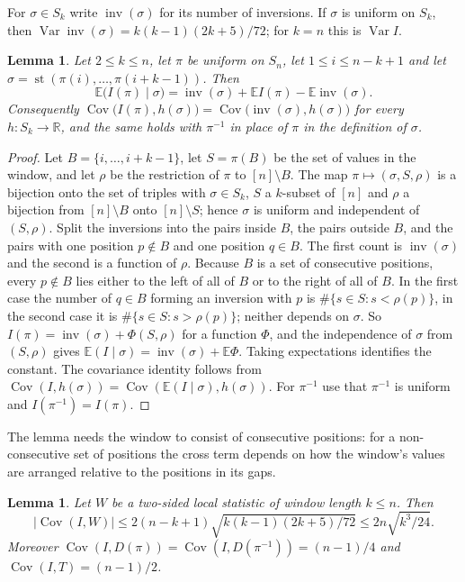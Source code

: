 \documentclass[11pt]{amsart}
\newtheorem{lemma}[theorem]{Lemma}
\theoremstyle{remark}
\newcommand{\E}{\mathbb{E}}
\newcommand{\Var}{\operatorname{Var}}
\newcommand{\Cov}{\operatorname{Cov}}
\newcommand{\inv}{\operatorname{inv}}
\begin{document}
For $\sigma\in S_k$ write $\inv(\sigma)$ for its number of inversions. If $\sigma$ is uniform on $S_k$, then
$\Var\inv(\sigma)=k(k-1)(2k+5)/72$; for $k=n$ this is $\Var I$.

\begin{lemma}\label{lem:window}
Let $2\le k\le n$, let $\pi$ be uniform on $S_n$, let $1\le i\le n-k+1$ and let $\sigma=\operatorname{st}(\pi(i),\dots,\pi(i+k-1))$.
Then
\[
\E\bigl(I(\pi)\mid\sigma\bigr)=\inv(\sigma)+\E I(\pi)-\E\inv(\sigma).
\]
Consequently $\Cov\bigl(I(\pi),h(\sigma)\bigr)=\Cov\bigl(\inv(\sigma),h(\sigma)\bigr)$ for every $h:S_k\to\mathbb R$,
and the same holds with $\pi^{-1}$ in place of $\pi$ in the definition of $\sigma$.
\end{lemma}

\begin{proof}
Let $B=\{i,\dots,i+k-1\}$, let $S=\pi(B)$ be the set of values in the window, and let $\rho$ be the restriction of
$\pi$ to $[n]\setminus B$. The map $\pi\mapsto(\sigma,S,\rho)$ is a bijection onto the set of triples with
$\sigma\in S_k$, $S$ a $k$-subset of $[n]$ and $\rho$ a bijection from $[n]\setminus B$ onto $[n]\setminus S$; hence
$\sigma$ is uniform and independent of $(S,\rho)$. Split the inversions into the pairs inside $B$, the pairs outside
$B$, and the pairs with one position $p\notin B$ and one position $q\in B$. The first count is $\inv(\sigma)$ and the
second is a function of $\rho$. Because $B$ is a set of consecutive positions, every $p\notin B$ lies either to the
left of all of $B$ or to the right of all of $B$. In the first case the number of $q\in B$ forming an inversion with
$p$ is $\#\{s\in S:s<\rho(p)\}$, in the second case it is $\#\{s\in S:s>\rho(p)\}$; neither depends on $\sigma$. So
$I(\pi)=\inv(\sigma)+\Phi(S,\rho)$ for a function $\Phi$, and the independence of $\sigma$ from $(S,\rho)$ gives
$\E(I\mid\sigma)=\inv(\sigma)+\E\Phi$. Taking expectations identifies the constant. The covariance identity follows
from $\Cov(I,h(\sigma))=\Cov(\E(I\mid\sigma),h(\sigma))$. For $\pi^{-1}$ use that $\pi^{-1}$ is uniform and
$I(\pi^{-1})=I(\pi)$.
\end{proof}

The lemma needs the window to consist of consecutive positions: for a non-consecutive set of positions the
cross term depends on how the window's values are arranged relative to the positions in its gaps.

\begin{lemma}\label{lem:cov}
Let $W$ be a two-sided local statistic of window length $k\le n$. Then
\[
\bigl|\Cov(I,W)\bigr|\le 2(n-k+1)\sqrt{k(k-1)(2k+5)/72}\le 2n\sqrt{k^3/24}.
\]
Moreover $\Cov(I,D(\pi))=\Cov(I,D(\pi^{-1}))=(n-1)/4$ and $\Cov(I,T)=(n-1)/2$.
\end{lemma}
\end{document}
